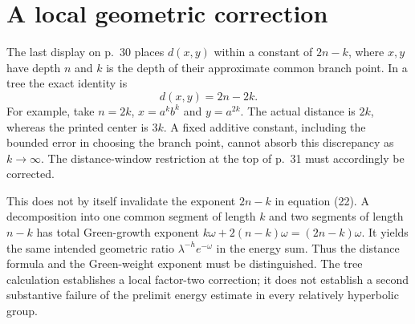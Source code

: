 \documentclass[10pt]{article}
\begin{document}
\section*{A local geometric correction}
The last display on p. 30 places \(d(x,y)\) within a constant of \(2n-k\), where \(x,y\) have depth \(n\) and \(k\) is the depth of their approximate common branch point. In a tree the exact identity is \[d(x,y)=2n-2k .\] For example, take \(n=2k\), \(x=a^k b^k\) and \(y=a^{2k}\). The actual distance is \(2k\), whereas the printed center is \(3k\). A fixed additive constant, including the bounded error in choosing the branch point, cannot absorb this discrepancy as \(k\to\infty\). The distance-window restriction at the top of p. 31 must accordingly be corrected.\par
This does not by itself invalidate the exponent \(2n-k\) in equation (22). A decomposition into one common segment of length \(k\) and two segments of length \(n-k\) has total Green-growth exponent \(k\omega+2(n-k)\omega=(2n-k)\omega\). It yields the same intended geometric ratio \(\lambda^{-h}e^{-\omega}\) in the energy sum. Thus the distance formula and the Green-weight exponent must be distinguished. The tree calculation establishes a local factor-two correction; it does not establish a second substantive failure of the prelimit energy estimate in every relatively hyperbolic group.\par
\end{document}
